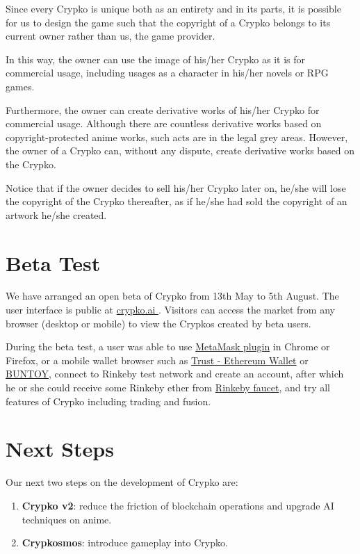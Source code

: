 \documentclass[a4paper]{article}
\begin{document}
Since every Crypko is unique both as an entirety and in its parts, it is possible for us to design the game such that the copyright of a Crypko belongs to its current owner rather than us, the game provider.

In this way, the owner can use the image of his/her Crypko as it is for commercial usage, including usages as a character in his/her novels or RPG games. 

Furthermore, the owner can create derivative works of his/her Crypko for commercial usage.
Although there are countless derivative works based on copyright-protected anime works, such acts are in the legal grey areas. However, the owner of a Crypko can, without any dispute, create derivative works based on the Crypko.

Notice that if the owner decides to sell his/her Crypko later on, he/she will lose the copyright of the Crypko thereafter, as if he/she had sold the copyright of an artwork he/she created.

\section{Beta Test}

We have arranged an open beta of Crypko from 13th May to 5th August. 
The user interface is public at \href{http://crypko.ai}{ crypko.ai }. Visitors can access the market from any browser (desktop or mobile) to view the Crypkos created by beta users.

During the beta test, a user was able to use \href{https://metamask.io/}{MetaMask plugin} in Chrome or Firefox, or a mobile wallet browser such as \href{https://trustwalletapp.com/}{Trust - Ethereum Wallet} or \href{http://www.buntoy.com/} {BUNTOY}, connect to Rinkeby test network and create an account, after which he or she could receive some Rinkeby ether from \href{https://www.rinkeby.io/#faucet}{Rinkeby faucet}, and try all features of Crypko including trading and fusion.

\section{Next Steps}

Our next two steps on the development of Crypko are:
\begin{enumerate}
\item \textbf{Crypko v2}: reduce the friction of blockchain operations and upgrade AI techniques on anime.
\item \textbf{Crypkosmos}: introduce gameplay into Crypko.
\end{enumerate}
\end{document}
